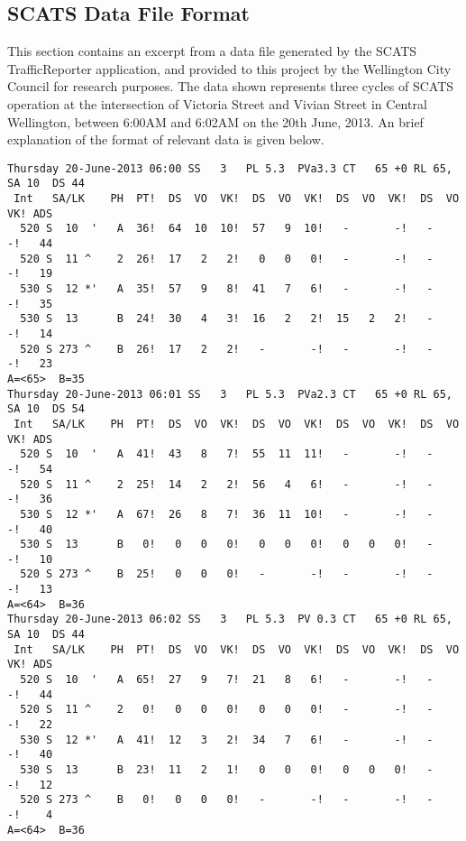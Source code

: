 \begin{appendices}
\chapter{SCATS Data File Format}
\label{appendix:scats_data_file}

This section contains an excerpt from a data file generated by the SCATS TrafficReporter application, and provided to this project by the Wellington City Council for research purposes. The data shown represents three cycles of SCATS operation at the intersection of Victoria Street and Vivian Street in Central Wellington, between 6:00AM and 6:02AM on the 20th June, 2013. An brief explanation of the format of relevant data is given below.

\begin{verbatim}
Thursday 20-June-2013 06:00 SS   3   PL 5.3  PVa3.3 CT   65 +0 RL 65, SA 10  DS 44
 Int   SA/LK    PH  PT!  DS  VO  VK!  DS  VO  VK!  DS  VO  VK!  DS  VO  VK! ADS
  520 S  10  '   A  36!  64  10  10!  57   9  10!   -       -!   -       -!   44
  520 S  11 ^    2  26!  17   2   2!   0   0   0!   -       -!   -       -!   19
  530 S  12 *'   A  35!  57   9   8!  41   7   6!   -       -!   -       -!   35
  530 S  13      B  24!  30   4   3!  16   2   2!  15   2   2!   -       -!   14
  520 S 273 ^    B  26!  17   2   2!   -       -!   -       -!   -       -!   23
A=<65>  B=35
Thursday 20-June-2013 06:01 SS   3   PL 5.3  PVa2.3 CT   65 +0 RL 65, SA 10  DS 54
 Int   SA/LK    PH  PT!  DS  VO  VK!  DS  VO  VK!  DS  VO  VK!  DS  VO  VK! ADS
  520 S  10  '   A  41!  43   8   7!  55  11  11!   -       -!   -       -!   54
  520 S  11 ^    2  25!  14   2   2!  56   4   6!   -       -!   -       -!   36
  530 S  12 *'   A  67!  26   8   7!  36  11  10!   -       -!   -       -!   40
  530 S  13      B   0!   0   0   0!   0   0   0!   0   0   0!   -       -!   10
  520 S 273 ^    B  25!   0   0   0!   -       -!   -       -!   -       -!   13
A=<64>  B=36
Thursday 20-June-2013 06:02 SS   3   PL 5.3  PV 0.3 CT   65 +0 RL 65, SA 10  DS 44
 Int   SA/LK    PH  PT!  DS  VO  VK!  DS  VO  VK!  DS  VO  VK!  DS  VO  VK! ADS
  520 S  10  '   A  65!  27   9   7!  21   8   6!   -       -!   -       -!   44
  520 S  11 ^    2   0!   0   0   0!   0   0   0!   -       -!   -       -!   22
  530 S  12 *'   A  41!  12   3   2!  34   7   6!   -       -!   -       -!   40
  530 S  13      B  23!  11   2   1!   0   0   0!   0   0   0!   -       -!   12
  520 S 273 ^    B   0!   0   0   0!   -       -!   -       -!   -       -!    4
A=<64>  B=36
\end{verbatim}


\end{appendices}
